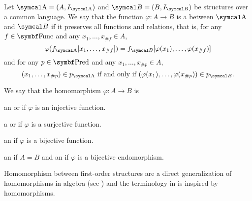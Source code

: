 \begin{definition}\label{def:first_order_homomorphism}\cite[definition 23.8]{OpenLogic20201202}
  Let \( \CA = (A, I_{\CA}) \) and \( \Cal{B} = (B, I_{\Cal{B}}) \) be structures over a common language. We say that the function \( \varphi: A \to B \) is a  between \( \CA \) and \( \Cal{B} \) if it preserves all functions and relations, that is, for any \( f \in \Cat{Func} \) and any \( x_1, \ldots, x_{\#f} \in A \),
  \begin{equation*}
    \varphi(f_{\CA}[x_1, \ldots, x_{\#f}]) = f_{\Cal{B}}[\varphi(x_1), \ldots, \varphi(x_{\#f})]
  \end{equation*}
  and for any \( p \in \Cat{Pred} \) and any \( x_1, \ldots, x_{\#p} \in A \),
  \begin{equation*}
    (x_1, \ldots, x_{\#p}) \in p_{\CA} \text{ if and only if } (\varphi(x_1), \ldots, \varphi(x_{\#p})) \in p_{\Cal{B}}.
  \end{equation*}

  We say that the homomorphism \( \varphi: A \to B \) is
  \begin{defenum}
     an  or  if \( \varphi \) is an injective function.

     a  or  if \( \varphi \) is a surjective function.

     an  if \( \varphi \) is a bijective function.

     an  if \( A = B \) and an  if \( \varphi \) is a bijective endomorphism.
  \end{defenum}

  Homomorphism between first-order structures are a direct generalization of homomorphisms in algebra (see ) and the terminology in  is inspired by homomorphisms.
\end{definition}

